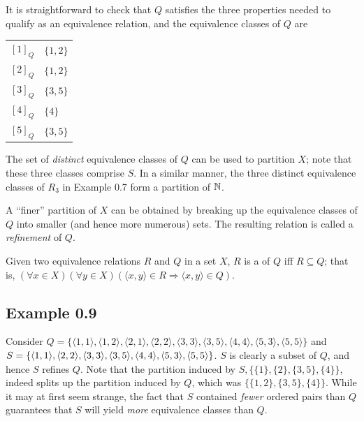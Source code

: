 It is straightforward to check that $Q$ satisfies the three properties needed to
qualify as an equivalence relation, and the equivalence classes of $Q$ are
\begin{center}\begin{tabular}{r@{ $=$ }l}
$[1]_Q$ & $\{1,2\}$ \\
$[2]_Q$ & $\{1,2\}$ \\
$[3]_Q$ & $\{3,5\}$ \\
$[4]_Q$ & $\{4\}$ \\
$[5]_Q$ & $\{3,5\}$
\end{tabular}\end{center}

The set of \emph{distinct} equivalence classes of $Q$ can be used to partition
$X$; note that these three classes comprise $S$. In a similar manner, the three
distinct equivalence classes of $R_3$ in Example 0.7 form a partition of $\mathbb{N}$.

A ``finer'' partition of $X$ can be obtained by breaking up the equivalence
classes of $Q$ into smaller (and hence more numerous) sets. The resulting
relation is called a \emph{refinement} of $Q$.

\begin{dfn}\label{dfn-0.10}
Given two equivalence relations $R$ and $Q$ in a set $X$, $R$ is a
\emph{} of $Q\text{ iff }R \subseteq Q$; that is,
$(\forall x \in X)(\forall y \in X)(\langle x,y\rangle  \in R \Rightarrow \langle x,y\rangle  \in Q).$
\end{dfn}

\subsection*{Example 0.9}

Consider $Q = \{\langle 1, 1\rangle, \langle 1,2\rangle, \langle 2,1\rangle,
\langle 2,2\rangle, \langle 3,3\rangle, \langle 3,5\rangle, \langle 4,4\rangle,
\langle 5,3\rangle, \langle 5,5\rangle\}$
and $S =\{\langle 1, 1\rangle, \langle 2,2\rangle, \langle 3,3\rangle, \\
\langle 3,5\rangle, \langle 4,4\rangle, \langle 5,3\rangle,
\langle 5, 5\rangle\}$. $S$ is clearly a subset of $Q$, and hence $S$ refines
$Q$. Note that the partition induced by $S, \{\{1\}, \{2\}, \{3,5\},\{4\}\}$,
indeed splits up the partition induced by $Q$, which was
$\{\{1,2\},\{3,5\}, \{4\}\}$. While it may at first seem strange, the fact that
$S$ contained \emph{fewer} ordered pairs than $Q$ guarantees that $S$ will yield 
\emph{more} equivalence classes than $Q$.


